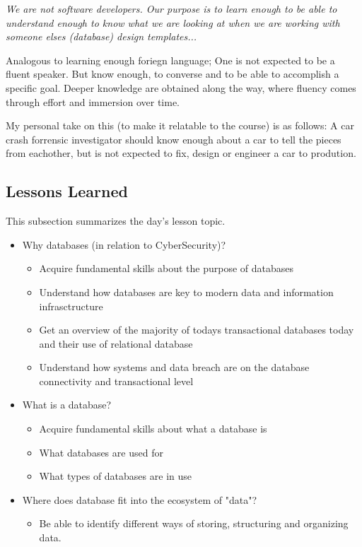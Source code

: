 {\begin{displayquote}\label{quote}
    {\emph{We are not software developers. Our purpose is to learn enough to be able to understand enough to know what we are looking at when we are working with someone elses (database) design templates...\\}}
    {}
\end{displayquote}

Analogous to learning enough foriegn language; One is not expected to be a fluent speaker. But know enough, to converse and to be able to accomplish a specific goal. Deeper knowledge are obtained along the way, where fluency comes through effort and immersion over time. 

My personal take on this (to make it relatable to the course) is as follows: A car crash forrensic investigator should know enough about a car to tell the pieces from eachother, but is not expected to fix, design or engineer a car to prodution.



\subsection{Lessons Learned}

This subsection summarizes the day's lesson topic.

\begin{itemize}
    \item Why databases (in relation to CyberSecurity)?
        \begin{itemize}
            \item Acquire fundamental skills about the purpose of databases
            \item Understand how databases are key to modern data and information infrasctructure
            \item Get an overview of the majority of todays transactional databases today and their use of relational database
            \item Understand how systems and data breach are on the database connectivity and transactional level
        \end{itemize}
    \item What is a database?
        \begin{itemize}
            \item Acquire fundamental skills about what a database is
            \item What databases are used for
            \item What types of databases are in use
        \end{itemize}
    \item Where does database fit into the ecosystem of "data"?
        \begin{itemize}
            \item Be able to identify different ways of storing, structuring and organizing data.
        \end{itemize}
\end{itemize}


}
